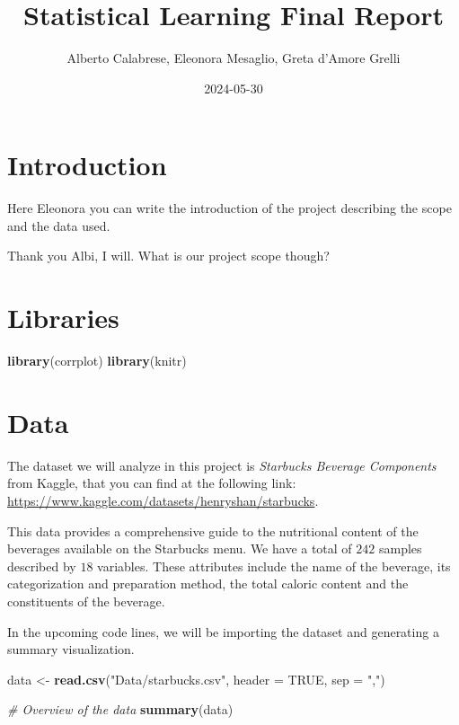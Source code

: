 \documentclass[
]{article}
\title{Statistical Learning Final Report}
\author{Alberto Calabrese, Eleonora Mesaglio, Greta d'Amore Grelli}
\date{2024-05-30}
\newenvironment{Shaded}{\begin{snugshade}}{\end{snugshade}}
\newcommand{\AttributeTok}[1]{\textcolor[rgb]{0.13,0.29,0.53}{#1}}
\newcommand{\CommentTok}[1]{\textcolor[rgb]{0.56,0.35,0.01}{\textit{#1}}}
\newcommand{\ConstantTok}[1]{\textcolor[rgb]{0.56,0.35,0.01}{#1}}
\newcommand{\FunctionTok}[1]{\textcolor[rgb]{0.13,0.29,0.53}{\textbf{#1}}}
\newcommand{\NormalTok}[1]{#1}
\newcommand{\OtherTok}[1]{\textcolor[rgb]{0.56,0.35,0.01}{#1}}
\newcommand{\StringTok}[1]{\textcolor[rgb]{0.31,0.60,0.02}{#1}}
\begin{document}
\maketitle

{
\setcounter{tocdepth}{3}
\tableofcontents
}
\hypertarget{introduction}{%
\section{Introduction}\label{introduction}}

Here Eleonora you can write the introduction of the project describing
the scope and the data used.

Thank you Albi, I will. What is our project scope though?

\hypertarget{libraries}{%
\section{Libraries}\label{libraries}}

\begin{Shaded}
\begin{Highlighting}[]
\FunctionTok{library}\NormalTok{(corrplot)}
\FunctionTok{library}\NormalTok{(knitr)}
\end{Highlighting}
\end{Shaded}

\hypertarget{data}{%
\section{Data}\label{data}}

The dataset we will analyze in this project is \emph{Starbucks Beverage
Components} from Kaggle, that you can find at the following link:
\url{https://www.kaggle.com/datasets/henryshan/starbucks}.

This data provides a comprehensive guide to the nutritional content of
the beverages available on the Starbucks menu. We have a total of
\(242\) samples described by \(18\) variables. These attributes include
the name of the beverage, its categorization and preparation method, the
total caloric content and the constituents of the beverage.

In the upcoming code lines, we will be importing the dataset and
generating a summary visualization.

\begin{Shaded}
\begin{Highlighting}[]
\NormalTok{data }\OtherTok{\textless{}{-}} \FunctionTok{read.csv}\NormalTok{(}\StringTok{"Data/starbucks.csv"}\NormalTok{, }\AttributeTok{header =} \ConstantTok{TRUE}\NormalTok{, }\AttributeTok{sep =} \StringTok{","}\NormalTok{)}

\CommentTok{\# Overview of the data}
\FunctionTok{summary}\NormalTok{(data)}
\end{Highlighting}
\end{Shaded}
\end{document}
